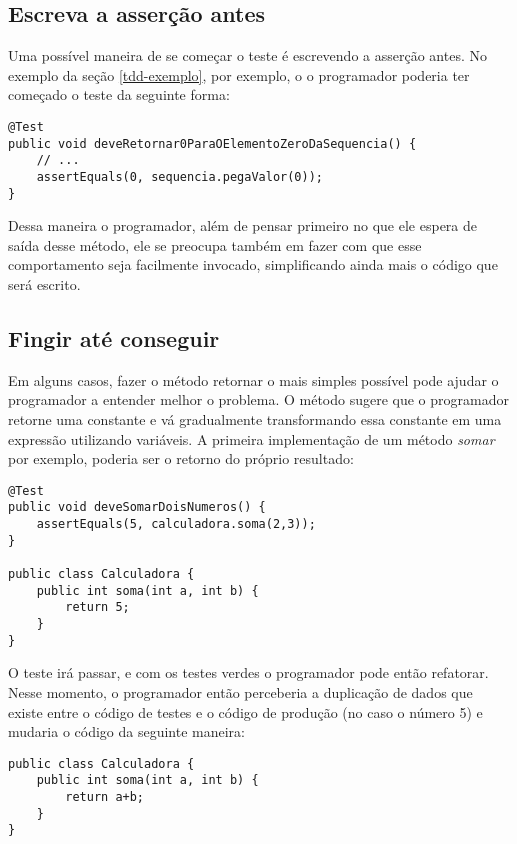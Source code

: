 \subsection{Escreva a asserção antes}

Uma possível maneira de se começar o teste é escrevendo a asserção antes. No exemplo da seção \ref{tdd-exemplo}, por exemplo, o 
o programador poderia ter começado o teste da seguinte forma:

\begin{lstlisting}[frame=trbl]
@Test
public void deveRetornar0ParaOElementoZeroDaSequencia() {
	// ...
	assertEquals(0, sequencia.pegaValor(0));
}
\end{lstlisting}

Dessa maneira o programador, além de pensar primeiro no que ele espera de saída desse método, ele se preocupa também 
em fazer com que esse comportamento seja facilmente invocado, simplificando ainda mais o código que será escrito. 

\subsection{Fingir até conseguir}
\label{sec:fake-it}

Em alguns casos, fazer o método retornar o mais simples possível pode ajudar o programador a entender melhor o problema.
O método sugere que o programador retorne uma constante e vá gradualmente transformando essa constante em uma expressão
utilizando variáveis. A primeira implementação de um método \textit{somar} por exemplo, poderia ser o retorno do 
próprio resultado:

\begin{lstlisting}[frame=trbl]
@Test
public void deveSomarDoisNumeros() {
	assertEquals(5, calculadora.soma(2,3));
}

public class Calculadora {
	public int soma(int a, int b) {
		return 5;
	}
}
\end{lstlisting}

O teste irá passar, e com os testes verdes o programador pode então refatorar. Nesse momento, o programador então
perceberia a duplicação de dados que existe entre o código de testes e o código de produção (no caso o número 5) e 
mudaria o código da seguinte maneira:

\begin{lstlisting}[frame=trbl]
public class Calculadora {
	public int soma(int a, int b) {
		return a+b;
	}
}
\end{lstlisting}

